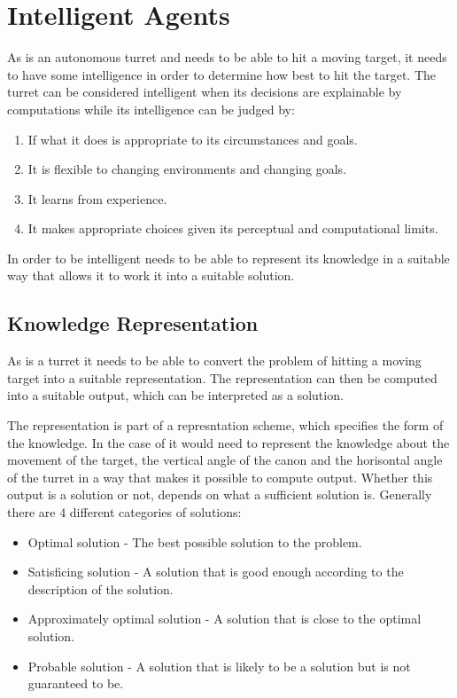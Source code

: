 \section{Intelligent Agents}

As \name is an autonomous turret and needs to be able to hit a moving target,
it needs to have some intelligence in order to determine how best to hit the
target. The turret can be considered intelligent when its decisions
are explainable by computations while its intelligence can be judged by:

\begin{enumerate}
  \item If what it does is appropriate to its circumstances and goals.
  \item It is flexible to changing environments and changing goals.
  \item It learns from experience.
  \item It makes appropriate choices given its perceptual and computational
  limits.
\end{enumerate}


In order to be intelligent \name needs to be able to represent its knowledge in
a suitable way that allows it to work it into a suitable solution.

\subsection{Knowledge Representation}

As \name is a turret it needs to be able to convert the problem of hitting a
moving target into a suitable representation. The representation can then be
computed into a suitable output, which can be interpreted as a solution.


The representation is part of a represntation scheme, which specifies the form
of the knowledge. In the case of \name it would need to represent the knowledge
about the movement of the target, the vertical angle of the canon and the
horisontal angle of the turret in a way that makes it possible to compute
output. Whether this output is a solution or not, depends on what a sufficient
solution is. Generally there are 4 different categories of solutions:

\begin{itemize}
  \item Optimal solution - The best possible solution to the problem.
  \item Satisficing solution - A solution that is good enough according to the
  description of the solution.
  \item Approximately optimal solution - A solution that is close to the optimal
  solution.
  \item Probable solution - A solution that is likely to be a solution but is
  not guaranteed to be.
\end{itemize}

